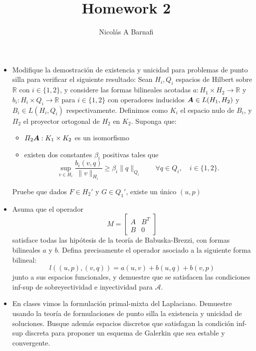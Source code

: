 \documentclass{article}
\title{Homework 2}
\author{Nicol\'as A Barnafi}
\newcommand{\mat}{\matrixsym}
\newcommand{\R}{\mathbb{R}}
\begin{document}
\maketitle

\begin{itemize}
    \item Modifique la demostración de existencia y unicidad para problemas de punto silla para verificar el siguiente resultado: Sean $H_i, Q_i$ espacios de Hilbert sobre $\R$ con $i\in\{1,2\}$, y considere las formas bilineales acotadas $a:H_1\times H_2\to \R$ y $b_i:H_i\times Q_i\to \R$ para $i\in\{1,2\}$ con operadores inducidos $\mat A\in L(H_1, H_2)$ y $B_i\in L(H_i,Q_i)$ respectivamente. Definimos como $K_i$ el espacio nulo de $B_i$, y $\Pi_2$ el proyector ortogonal de $H_2$ en $K_2$. Suponga que:
        \begin{itemize}
            \item $\Pi_2\mat A:K_1\times K_2$ es un isomorfismo
            \item existen dos constantes $\beta_i$ positivas tales que
                $$ \sup_{v\in H_i} \frac{b_i(v,q)}{\|v\|_{H_i}} \geq \beta_i \| q \|_{Q_i} \qquad \forall q \in Q_i, \quad i \in \{1,2\}. $$
        \end{itemize}
        Pruebe que dados $F\in H_2'$ y $G\in Q_1'$, existe un único $(u,p)$
    \item Asuma que el operador
        $$ M = \begin{bmatrix} A & B^T \\ B & 0 \end{bmatrix} $$
            satisface todas las hipótesis de la teoría de Babuska-Brezzi, con formas bilineales $a$ y $b$. Defina precisamente el operador asociado a la siguiente forma bilineal:
            $$ l( (u,p), (v,q)) = a(u,v) + b(u,q) + b(v,p) $$
            junto a sus espacios funcionales, y demuestre que se satisfacen las condiciones inf-sup de sobreyectividad e inyectividad para $\mathcal A$.
    \item En clases vimos la formulación primal-mixta del Laplaciano. Demuestre usando la teoría de formulaciones de punto silla la existencia y unicidad de soluciones. Busque además espacios discretos que satisfagan la condición inf-sup discreta para proponer un esquema de Galerkin que sea estable y convergente.


\end{itemize}
\end{document}
